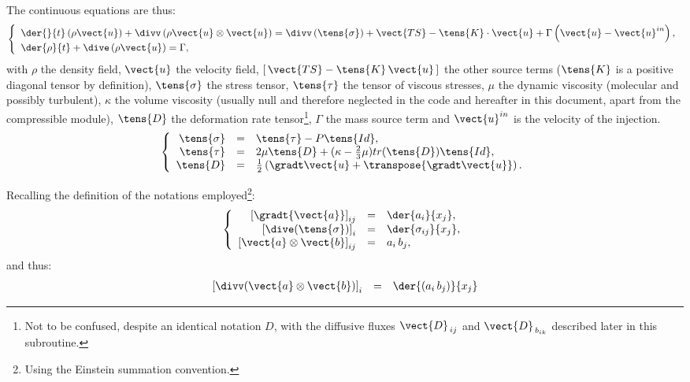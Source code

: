 The continuous equations are thus:
\begin{equation}
\left\{
\begin{array}{l}
\displaystyle \der{}{t} \left( \rho \vect{u} \right) + \divv \left( \rho  \vect{u} \otimes \vect{u} \right)
=\divv \left( \tens{\sigma} \right) + \vect{TS} - \tens{K} \cdot \vect{u} + \Gamma \left( \vect{u} - \vect{u}^{in}\right),\\
\der{\rho}{t} + \dive \left( \rho \vect{u} \right) = \Gamma ,
\end{array}\right.
\end{equation}
%
with $\rho$ the density field, $\vect{u}$ the velocity field,
$[\,\vect{TS}-\tens{K}\,\vect{u}\,]$ the other source terms ($\tens{K}$ is a
positive diagonal tensor by definition), $\tens{\sigma}$ the stress tensor,
$\tens{\tau}$ the tensor of viscous stresses,
$\mu$ the dynamic viscosity (molecular and possibly turbulent),
$\kappa$ the volume viscosity (usually null and therefore neglected in
the code and hereafter in this document, apart from the compressible module),
$\tens{D}$ the deformation rate tensor\footnote{Not to be confused,
despite an identical notation $D$, with the diffusive fluxes
$\vect{D}_{\,ij}$ and $\vect{D}_{\,{b}_{ik}}$ described later in this
subroutine.}, $\Gamma$ the mass source term and $\vect{u}^{in}$ is the velocity of the injection.
\begin{equation}
\left\{
\begin{array}{r c l}
\tens{\sigma} & = & \tens{\tau} - P\tens{Id} ,  \\
\tens{\tau} & = & 2 \mu  \tens{D} +  (\kappa  - \frac{2}{3}\mu) tr({\tens{D}})
\tens{Id} , \\
\tens{D} &=& \frac{1}{2}\left( \gradt\vect{u}+ \transpose{\gradt\vect{u}} \right).
\end{array}\right.
\end{equation}

Recalling the definition of the notations employed\footnote{Using the
Einstein summation convention.}:
\begin{equation}\notag
\left\{\begin{array}{r c l}
\left[\gradt{\vect{a}}\right]_{ij} &=& \der{a_i}{x_j},\\
\left[\dive(\tens{\sigma})\right]_i &=& \der{\sigma_{ij}}{x_j},\\
\left[\vect{a}\otimes\vect{b}\right]_{ij} &= &
a_i\,b_j,\\
\end{array}\right.
\end{equation}
and thus:
\begin{equation}\notag
\begin{array}{lll}
\left[\divv(\vect{a}\otimes\vect{b})\right]_i &= &
\der{(a_i\,b_j)}{x_j} 
\end{array}
\end{equation}

